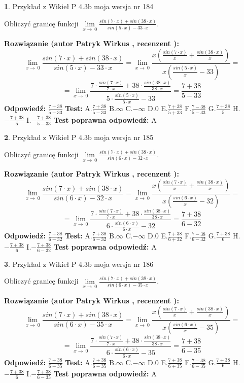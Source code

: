 \documentclass[12pt, a4paper]{article}
\theoremstyle{definition} %
\newtheorem{zad}{}
\newcommand{\zadStart}[1]{\begin{zad}#1\newline}
\newcommand{\zadStop}{\end{zad}}
\newcommand{\rozwStart}[2]{\noindent \textbf{Rozwiązanie (autor #1 , recenzent #2): }\newline}
\newcommand{\rozwStop}{\newline}
\newcommand{\odpStart}{\noindent \textbf{Odpowiedź:}\newline}
\newcommand{\odpStop}{\newline}
\newcommand{\testStart}{\noindent \textbf{Test:}\newline}
\newcommand{\testStop}{\newline}
\newcommand{\kluczStart}{\noindent \textbf{Test poprawna odpowiedź:}\newline}
\newcommand{\kluczStop}{\newline}
\begin{document}
\zadStart{Przykład z Wikieł P 4.3b moja wersja nr 184}


Obliczyć granicę funkcji $\lim\limits_{x\to\ 0}\frac{sin(7 \cdot x)+sin(38 \cdot x)}{sin(5 \cdot x)-33 \cdot x}$.
\zadStop
\rozwStart{Patryk Wirkus}{}
$$\lim\limits_{x\to\ 0}\frac{sin(7 \cdot x)+sin(38 \cdot x)}{sin(5 \cdot x)-33 \cdot x}=\lim\limits_{x\to\ 0}\frac{x(\frac{sin(7 \cdot x)}{x}+\frac{sin(38 \cdot x)}{x})}{x(\frac{sin(5 \cdot x)}{x}-33)}=$$
$$=\lim\limits_{x\to\ 0}\frac{7 \cdot \frac{sin(7 \cdot x)}{7 \cdot x}+38 \cdot \frac{sin(38 \cdot x)}{38 \cdot x}}{5 \cdot \frac{sin(5 \cdot x)}{5 \cdot x}-33}=\frac{7+38}{5-33}$$
\rozwStop
\odpStart
$\frac{7+38}{5-33}$
\odpStop
\testStart
A.$\frac{7+38}{5-33}$
B.$\infty$
C.$-\infty$
D.$0$
E.$\frac{7+38}{5+33}$
F.$\frac{7-38}{5-33}$
G.$\frac{7+38}{5}$
H.$-\frac{7+38}{5}$
I.$-\frac{7+38}{5-33}$
\testStop
\kluczStart
A
\kluczStop



\zadStart{Przykład z Wikieł P 4.3b moja wersja nr 185}


Obliczyć granicę funkcji $\lim\limits_{x\to\ 0}\frac{sin(7 \cdot x)+sin(38 \cdot x)}{sin(6 \cdot x)-32 \cdot x}$.
\zadStop
\rozwStart{Patryk Wirkus}{}
$$\lim\limits_{x\to\ 0}\frac{sin(7 \cdot x)+sin(38 \cdot x)}{sin(6 \cdot x)-32 \cdot x}=\lim\limits_{x\to\ 0}\frac{x(\frac{sin(7 \cdot x)}{x}+\frac{sin(38 \cdot x)}{x})}{x(\frac{sin(6 \cdot x)}{x}-32)}=$$
$$=\lim\limits_{x\to\ 0}\frac{7 \cdot \frac{sin(7 \cdot x)}{7 \cdot x}+38 \cdot \frac{sin(38 \cdot x)}{38 \cdot x}}{6 \cdot \frac{sin(6 \cdot x)}{6 \cdot x}-32}=\frac{7+38}{6-32}$$
\rozwStop
\odpStart
$\frac{7+38}{6-32}$
\odpStop
\testStart
A.$\frac{7+38}{6-32}$
B.$\infty$
C.$-\infty$
D.$0$
E.$\frac{7+38}{6+32}$
F.$\frac{7-38}{6-32}$
G.$\frac{7+38}{6}$
H.$-\frac{7+38}{6}$
I.$-\frac{7+38}{6-32}$
\testStop
\kluczStart
A
\kluczStop



\zadStart{Przykład z Wikieł P 4.3b moja wersja nr 186}


Obliczyć granicę funkcji $\lim\limits_{x\to\ 0}\frac{sin(7 \cdot x)+sin(38 \cdot x)}{sin(6 \cdot x)-35 \cdot x}$.
\zadStop
\rozwStart{Patryk Wirkus}{}
$$\lim\limits_{x\to\ 0}\frac{sin(7 \cdot x)+sin(38 \cdot x)}{sin(6 \cdot x)-35 \cdot x}=\lim\limits_{x\to\ 0}\frac{x(\frac{sin(7 \cdot x)}{x}+\frac{sin(38 \cdot x)}{x})}{x(\frac{sin(6 \cdot x)}{x}-35)}=$$
$$=\lim\limits_{x\to\ 0}\frac{7 \cdot \frac{sin(7 \cdot x)}{7 \cdot x}+38 \cdot \frac{sin(38 \cdot x)}{38 \cdot x}}{6 \cdot \frac{sin(6 \cdot x)}{6 \cdot x}-35}=\frac{7+38}{6-35}$$
\rozwStop
\odpStart
$\frac{7+38}{6-35}$
\odpStop
\testStart
A.$\frac{7+38}{6-35}$
B.$\infty$
C.$-\infty$
D.$0$
E.$\frac{7+38}{6+35}$
F.$\frac{7-38}{6-35}$
G.$\frac{7+38}{6}$
H.$-\frac{7+38}{6}$
I.$-\frac{7+38}{6-35}$
\testStop
\kluczStart
A
\kluczStop
\end{document}
